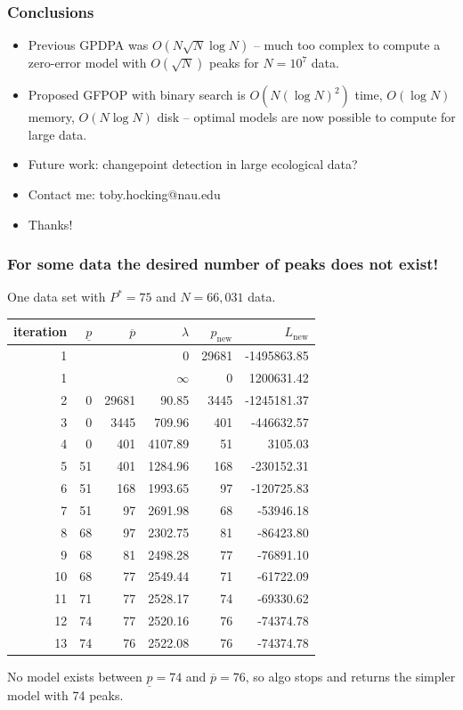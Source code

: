 \documentclass{beamer}
\begin{document}
\begin{frame}
  \frametitle{Conclusions}

  \begin{itemize}
  \item Previous GPDPA was $O(N\sqrt N\log N)$ -- much too complex to
    compute a zero-error model with $O(\sqrt N)$ peaks for $N=10^7$
    data.
  \item Proposed GFPOP with binary search is $O(N(\log N)^2)$ time,
    $O(\log N)$ memory, $O(N\log N)$ disk -- optimal models are now
    possible to compute for large data.
  \item Future work: changepoint detection in large ecological data?
  \item Contact me: toby.hocking@nau.edu
  \item Thanks!
  \end{itemize}
  
\end{frame}

\begin{frame}
  \frametitle{For some data
 the desired number of peaks does not exist!}

One data set with $P^*=75$ and $N=66,031$ data.

\begin{tabular}{rrrrrr}
\small
 iteration& $\underline p$& $\overline p$&    $\lambda$ & $p_{\text{new}}$& $L_{\text{new}}$\\
  \hline
    1 &  &  & 0 & 29681 & -1495863.85 \\ 
    1 &  &  & $\infty$ &   0 & 1200631.42 \\ 
    2 &   0 & 29681 & 90.85 & 3445 & -1245181.37 \\ 
    3 &   0 & 3445 & 709.96 & 401 & -446632.57 \\ 
    4 &   0 & 401 & 4107.89 &  51 & 3105.03 \\ 
    5 &  51 & 401 & 1284.96 & 168 & -230152.31 \\ 
    6 &  51 & 168 & 1993.65 &  97 & -120725.83 \\ 
    7 &  51 &  97 & 2691.98 &  68 & -53946.18 \\ 
    8 &  68 &  97 & 2302.75 &  81 & -86423.80 \\ 
    9 &  68 &  81 & 2498.28 &  77 & -76891.10 \\ 
   10 &  68 &  77 & 2549.44 &  71 & -61722.09 \\ 
   11 &  71 &  77 & 2528.17 &  74 & -69330.62 \\ 
   12 &  74 &  77 & 2520.16 &  76 & -74374.78 \\ 
   13 &  \alert{74} &  \alert{76} & \alert{2522.08} &  \alert{76} & -74374.78 \\ 
\end{tabular}

\alert{No model exists between $\underline p=74$ and
  $\overline p=76$, so algo stops and returns the simpler model with 74 peaks.}

\end{frame}
\end{document}
